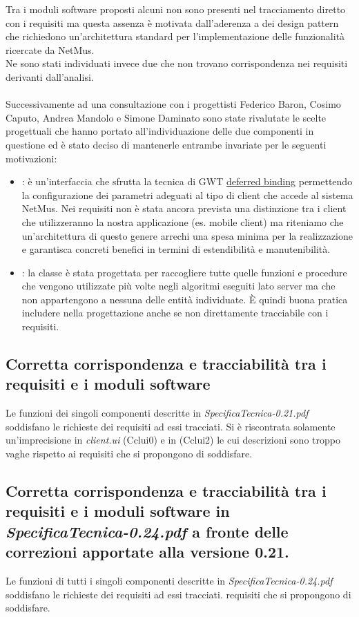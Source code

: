 Tra i moduli software proposti alcuni non sono presenti nel tracciamento
diretto con i requisiti ma questa assenza \`e motivata dall'aderenza a dei
design pattern che richiedono un'architettura standard per l'implementazione
delle funzionalit\`a ricercate da NetMus. \\
Ne sono stati individuati invece due che non trovano corrispondenza nei
requisiti derivanti dall'analisi. \\\\ 
Successivamente ad una consultazione con i progettisti Federico Baron, Cosimo
Caputo, Andrea Mandolo e Simone Daminato sono state rivalutate le scelte
progettuali che hanno portato all'individuazione delle due componenti in
questione ed \`e stato deciso di mantenerle entrambe invariate per le seguenti
motivazioni:
\begin{itemize}
  \item{:  \`e un'interfaccia che sfrutta la tecnica
  di GWT \underline{deferred binding} permettendo la configurazione dei
  parametri adeguati al tipo di client che accede al sistema NetMus. Nei
  requisiti non \`e stata ancora prevista una distinzione tra i client che
  utilizzeranno la nostra applicazione (es. mobile client) ma riteniamo che
  un'architettura di questo genere arrechi una spesa minima per la realizzazione
  e garantisca concreti benefici in termini di estendibilit\`a e manutenibilit\`a.}
  \item{: la classe  \`e stata progettata per raccogliere
  tutte quelle funzioni e procedure che vengono utilizzate pi\`u volte negli
  algoritmi eseguiti lato server ma che non appartengono a nessuna delle entit\`a
  individuate. \`E quindi buona pratica includere  nella progettazione
  anche se non direttamente tracciabile con i requisiti.}
\end{itemize}


\subsection*{Corretta corrispondenza e tracciabilit\`a tra i requisiti e  i
moduli software} Le funzioni dei singoli componenti descritte in
\emph{SpecificaTecnica-0.21.pdf} soddisfano le richieste dei requisiti ad essi
tracciati. Si \`e riscontrata solamente un'imprecisione in \emph{client.ui}
(Cclui0) e in  (Cclui2) le cui descrizioni sono troppo vaghe
rispetto ai requisiti che si propongono di soddisfare. 
\subsection*{Corretta corrispondenza e tracciabilit\`a tra i requisiti e  i
moduli software in \emph{SpecificaTecnica-0.24.pdf} a fronte delle correzioni
apportate alla versione 0.21.} 
Le funzioni di tutti i singoli componenti descritte in
\emph{SpecificaTecnica-0.24.pdf} soddisfano le richieste dei requisiti ad essi
tracciati. requisiti che si propongono di soddisfare.

